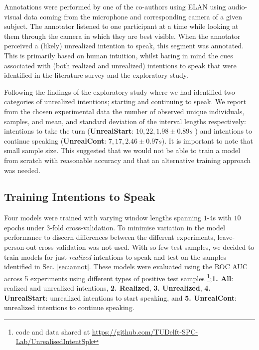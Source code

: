 \documentclass[sigconf]{acmart}
\begin{document}
Annotations were performed by one of the co-authors
using ELAN \cite{elan} using audio-visual data coming from the microphone and corresponding camera of a given subject. 
The annotator listened to one participant at a time while looking at them through the camera in which they are best visible. 
When the annotator perceived a (likely) unrealized intention to speak, this segment was annotated. This is primarily based on human intuition, whilst baring in mind the cues associated with (both realized and unrealized) intentions to speak that were identified in the literature survey and the exploratory study.

Following the findings of the exploratory study where we had identified two categories of unrealized intentions; starting and continuing to speak. We report from the chosen experimental data the number of observed unique individuals, samples, and mean, and standard deviation of the interval lengths respectively: intentions to take the turn (\textbf{UnrealStart}: $10,22,1.98\pm0.89s$ ) and intentions to continue speaking (\textbf{UnrealCont}: $7,17,2.46\pm0.97s$). 
It is important to note that small sample size. This suggested that we would not be able to train a model from scratch with reasonable accuracy and that an alternative training approach was needed.


\subsection{Training Intentions to Speak}
\label{sec:training}
Four models were trained with varying window lengths spanning $1$-$4$s with $10$ epochs under $3$-fold cross-validation. To minimise variation in the model performance to discern differences between the different experiments, leave-person-out cross validation was not used. With so few test samples, we decided to train models for just \emph{realized} intentions to speak and test on the samples identified in Sec. \ref{sec:annot}. These models were evaluated using the ROC AUC across 5 experiments using different types of positive test samples \footnote{code and data shared at \url{https://github.com/TUDelft-SPC-Lab/UnrealisedIntentSpk}};\textbf{1. All}: realized and unrealized intentions, 
\textbf{2. Realized}, 
\textbf{3. Unrealized}, 
 \textbf{4. UnrealStart}: unrealized intentions to start speaking, and \textbf{5. UnrealCont}: unrealized intentions to continue speaking.
\end{document}
